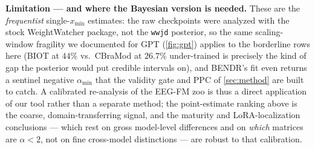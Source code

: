 \textbf{Limitation --- and where the Bayesian version is needed.} These are the \emph{frequentist}
single-$x_{\min}$ estimates: the raw checkpoints were analyzed with the stock WeightWatcher package, not
the \texttt{wwjd} posterior, so the same scaling-window fragility we documented for GPT (\cref{fig:gpt})
applies to the borderline rows here (BIOT at $44\%$ vs.\ CBraMod at $26.7\%$ under-trained is precisely
the kind of gap the posterior would put credible intervals on), and BENDR's fit even returns a sentinel
negative $\alpha_{\min}$ that the validity gate and PPC of \cref{sec:method} are built to catch. A
calibrated re-analysis of the EEG-FM zoo is thus a direct application of our tool rather than a separate
method; the point-estimate ranking above is the coarse, domain-transferring signal, and the maturity and
LoRA-localization conclusions --- which rest on gross model-level differences and on \emph{which} matrices
are $\alpha<2$, not on fine cross-model distinctions --- are robust to that calibration.
